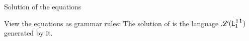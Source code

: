 \documentclass[xcolor=x11names,compress,mathserif]{beamer}
\renewcommand{\(}{\begin{columns}}
\renewcommand{\)}{\end{columns}}
\newcommand{\<}[1]{\begin{column}{#1}}
\renewcommand{\>}{\end{column}}
\begin{document}
\begin{frame}{Solution of the equations}

  View the equations as grammar rules:
  \linebreak
  \linebreak
  \linebreak
  The  solution of  is the   language  $\mathscr{L}(\mathsf{L}_{{1}}^{\mbox{\tt l1}})$ generated    by    it.
\end{frame}

\end{document}

